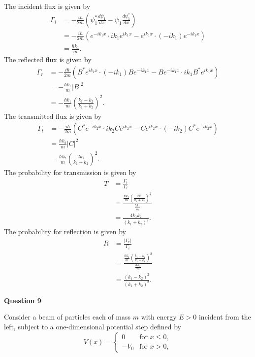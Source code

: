 \documentclass{article}
\begin{document}
The incident flux is given by
\begin{align*}
\Gamma_i &= -\frac{i\hbar}{2m} \left( \psi_1^* \frac{d\psi_1}{dx} - \psi_1 \frac{d\psi_1^*}{dx} \right) \\
&= -\frac{i\hbar}{2m} \left( e^{-ik_1x} \cdot ik_1e^{ik_1x} - e^{ik_1x} \cdot (-ik_1)e^{-ik_1x} \right) \\
&= \frac{\hbar k_1}{m}.
\end{align*}
The reflected flux is given by
\begin{align*}
\Gamma_r &= -\frac{i\hbar}{2m} \left( B^*e^{ik_1x} \cdot (-ik_1)Be^{-ik_1x} - Be^{-ik_1x} \cdot ik_1B^*e^{ik_1x} \right) \\
&= -\frac{\hbar k_1}{m}|B|^2 \\
&= -\frac{\hbar k_1}{m} \left( \frac{k_1 - k_2}{k_1 + k_2} \right)^2.
\end{align*}
The transmitted flux is given by
\begin{align*}
\Gamma_t &= -\frac{i\hbar}{2m} \left( C^*e^{-ik_2x} \cdot ik_2Ce^{ik_2x} - Ce^{ik_2x} \cdot (-ik_2)C^*e^{-ik_2x} \right) \\
&= \frac{\hbar k_2}{m}|C|^2 \\
&= \frac{\hbar k_2}{m} \left( \frac{2k_1}{k_1 + k_2} \right)^2.
\end{align*}
The probability for transmission is given by
\begin{align*}
T &= \frac{\Gamma_t}{\Gamma_i} \\
&= \frac{\frac{\hbar k_2}{m} \left( \frac{2k_1}{k_1 + k_2} \right)^2}{\frac{\hbar k_1}{m}} \\
&= \frac{4k_1k_2}{(k_1 + k_2)^2}.
\end{align*}
The probability for reflection is given by
\begin{align*}
R &= \frac{|\Gamma_r|}{\Gamma_i} \\
&= \frac{\frac{\hbar k_1}{m} \left( \frac{k_1 - k_2}{k_1 + k_2} \right)^2}{\frac{\hbar k_1}{m}} \\
&= \frac{(k_1 - k_2)^2}{(k_1 + k_2)^2}.
\end{align*}


\textbf{Question 9}

Consider a beam of particles each of mass  $m$ with energy $E>0$ incident from the left, subject to a one-dimensional potential step defined by
\[
V(x) =
\begin{cases}
0 & \text{for } x \leq 0, \\
-V_0 & \text{for } x > 0,
\end{cases}
\]
\end{document}
